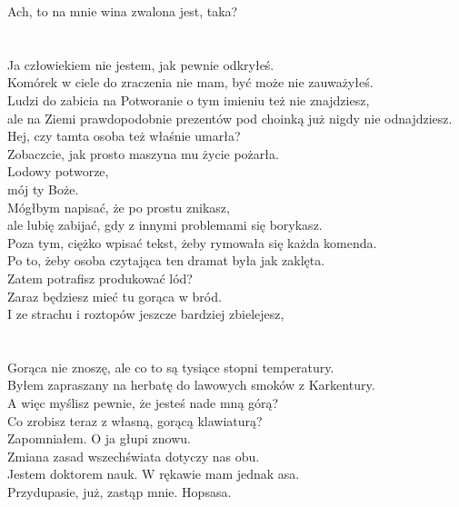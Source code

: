 \chardok{}
Ach, to na mnie wina zwalona jest, taka?\\
\\

\\

\charmik{}
Ja człowiekiem nie jestem, jak pewnie odkryłeś.\\
Komórek w ciele do zraczenia nie mam, być może nie zauważyłeś.\\
Ludzi do zabicia na Potworanie o tym imieniu też nie znajdziesz,\\
ale na Ziemi prawdopodobnie prezentów pod choinką już nigdy nie odnajdziesz.\\
Hej, czy tamta osoba też właśnie umarła?\\
Zobaczcie, jak prosto maszyna mu życie pożarła.\\

\chardok{}
Lodowy potworze,\\
mój ty Boże.\\
Mógłbym napisać, że po prostu znikasz, \\
ale lubię zabijać, gdy z innymi problemami się borykasz.\\
Poza tym, ciężko wpisać tekst, żeby rymowała się każda komenda.\\
Po to, żeby osoba czytająca ten dramat była jak zaklęta.\\
Zatem potrafisz produkować lód?\\
Zaraz będziesz mieć tu gorąca w bród.\\
I ze strachu i roztopów jeszcze bardziej zbielejesz,\\
\\

\\

\charmik{}
Gorąca nie znoszę, ale co to są tysiące stopni temperatury.\\
Byłem zapraszany na herbatę do lawowych smoków z Karkentury.\\
A więc myślisz pewnie, że jesteś nade mną górą?\\
Co zrobisz teraz z własną, gorącą klawiaturą?\\

\chardok{}
Zapomniałem. O ja głupi znowu.\\
Zmiana zasad wszechświata dotyczy nas obu.\\
Jestem doktorem nauk. W rękawie mam jednak asa.\\
Przydupasie, już, zastąp mnie. Hopsasa.\\

